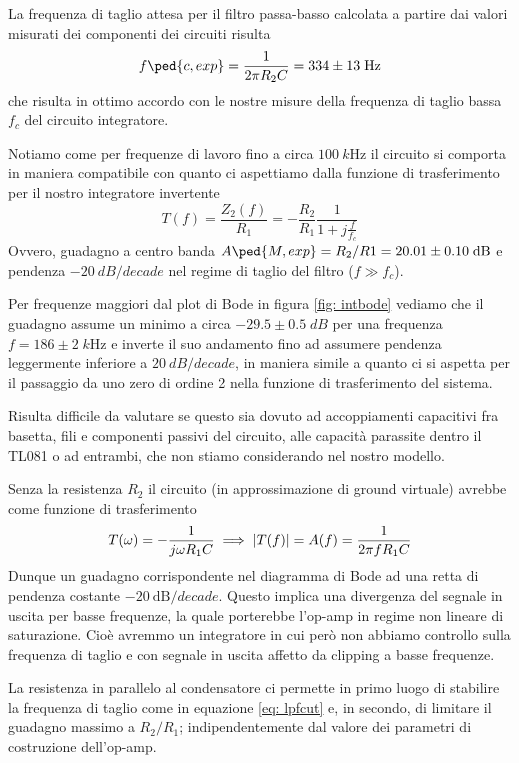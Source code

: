 \documentclass[10pt, a4paper, italian]{article}
\begin{document}
La frequenza di taglio attesa per il filtro passa-basso calcolata a partire
dai valori misurati dei componenti dei circuiti risulta
\begin{equation}\label{eq: lpfcut}
f\ped{c, exp} = \frac{1}{2\pi R_2 C} = 334 \pm 13 \; \si{\Hz}
\end{equation}
che risulta in ottimo accordo con le nostre misure della frequenza di taglio
bassa $f_c$ del circuito integratore.

Notiamo come per frequenze di lavoro fino a circa $\SI{100}{k\Hz}$ il circuito
si comporta in maniera compatibile con quanto ci aspettiamo dalla funzione di
trasferimento per il nostro integratore invertente
\begin{equation}\label{eq: lpfTfunc}
T(f) = \frac{Z_2(f)}{R_1} = - \frac{R_2}{R_1} \frac{1}{1 + j \frac{f}{f_c}}
\end{equation}
Ovvero, guadagno a centro banda
$A\ped{M, exp} = R_2/R1 = 20.01 \pm 0.10 \; \si{dB}$ e pendenza
$\SI{-20}{dB/decade}$ nel regime di taglio del filtro ($f \gg f_c$).

Per frequenze maggiori dal plot di Bode in figura \ref{fig: intbode} vediamo
che il guadagno assume un minimo a circa $-29.5 \pm 0.5 \; \si{dB}$ per
una frequenza $f = 186 \pm 2 \; \si{k\Hz}$ e inverte il suo andamento fino
ad assumere pendenza leggermente inferiore a $\SI{20}{dB/decade}$, in maniera
simile a quanto ci si aspetta per il passaggio da uno zero di ordine 2
nella funzione di trasferimento del sistema.

Risulta difficile da valutare se questo sia dovuto ad accoppiamenti capacitivi
fra basetta, fili e componenti passivi del circuito, alle capacità parassite
dentro il TL081 o ad entrambi, che non stiamo considerando nel nostro modello.

Senza la resistenza $R_2$ il circuito (in approssimazione di ground virtuale)
avrebbe come funzione di trasferimento
\[
T(\omega) = - \frac{1}{j \omega R_1 C} \implies
\left| T(f) \right| = A(f) = \frac{1}{2\pi f R_1 C}
\]
Dunque un guadagno corrispondente nel diagramma di Bode ad una retta di
pendenza costante $\SI{-20}{\deci\bel/decade}$.
Questo implica una divergenza del segnale in uscita per basse frequenze, la
quale porterebbe l'op-amp in regime non lineare di saturazione.
Cioè avremmo un integratore in cui però non abbiamo controllo sulla
frequenza di taglio e con segnale in uscita affetto da clipping a basse
frequenze.

La resistenza in parallelo al condensatore ci permette in primo luogo di
stabilire la frequenza di taglio come in equazione \eqref{eq: lpfcut} e,
in secondo, di limitare il guadagno massimo a $R_2/R_1$;
indipendentemente dal valore dei parametri di costruzione dell'op-amp.
\end{document}
